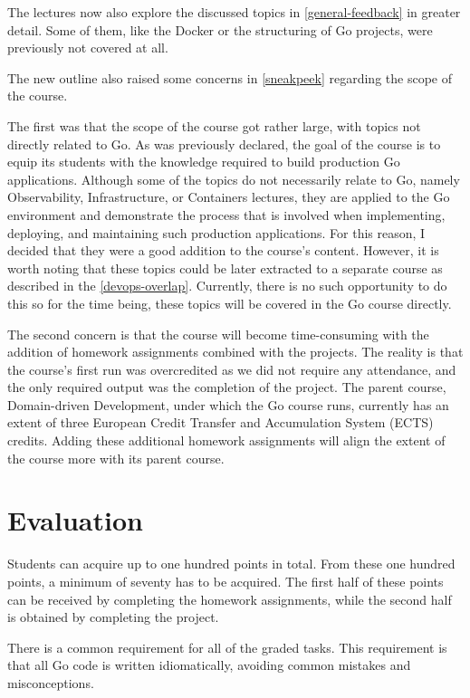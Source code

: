 \documentclass[
  digital,
  color,
  oneside,
  nosansbold,
  nocolorbold,
  nolof,
  nolot,
]{fithesis4}
\begin{document}
The lectures now also explore the discussed topics in \cref{general-feedback} in greater detail. Some of them, like the Docker or the structuring of Go projects, were previously not covered at all.

The new outline also raised some concerns in \cref{sneakpeek} regarding the scope of the course. 

The first was that the scope of the course got rather large, with topics not directly related to Go. As was previously declared, the goal of the course is to equip its students with the knowledge required to build production Go applications. Although some of the topics do not necessarily relate to Go, namely Observability, Infrastructure, or Containers lectures, they are applied to the Go environment and demonstrate the process that is involved when implementing, deploying, and maintaining such production applications. For this reason, I decided that they were a good addition to the course's content. However, it is worth noting that these topics could be later extracted to a separate course as described in the \cref{devops-overlap}. Currently, there is no such opportunity to do this so for the time being, these topics will be covered in the Go course directly.

The second concern is that the course will become time-consuming with the addition of homework assignments combined with the projects. The reality is that the course's first run was overcredited as we did not require any attendance, and the only required output was the completion of the project. The parent course, Domain-driven Development, under which the Go course runs, currently has an extent of three European Credit Transfer and Accumulation System (ECTS) credits. Adding these additional homework assignments will align the extent of the course more with its parent course.

\section{Evaluation}

Students can acquire up to one hundred points in total. From these one hundred points, a minimum of seventy has to be acquired. The first half of these points can be received by completing the homework assignments, while the second half is obtained by completing the project.

There is a common requirement for all of the graded tasks. This requirement is that all Go code is written idiomatically, avoiding common mistakes and misconceptions.
\end{document}
